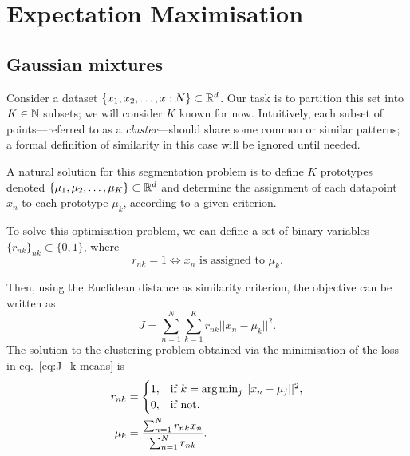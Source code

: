 \chapter{Expectation Maximisation}


\section{Gaussian mixtures}

Consider a dataset $\{x_1,x_2,\ldots,x:N\}\subset{\mathbb R}^d$. Our task is to partition this set into $K\in{\mathbb N}$ subsets; we will consider $K$ known for now.  Intuitively, each subset of points---referred to as a \emph{cluster}---should share some common or similar patterns; a formal definition of similarity in this case will be ignored until needed. 

A natural solution for this segmentation problem is to define $K$ prototypes denoted $\{\mu_1,\mu_2,\ldots,\mu_K\}\subset{\mathbb R}^d$ and determine the assignment of each datapoint $x_n$ to each prototype $\mu_k$, according to a given criterion. 

To solve this optimisation problem, we can define a set of binary variables $\{r_{nk}\}_{nk}\subset\{0,1\}$, where 
\begin{equation}
    r_{nk}=1 \iff x_n\text{ is assigned to } \mu_k. 
\end{equation}

Then, using the Euclidean distance as similarity criterion, the objective can be written as 
\begin{equation}
    J = \sum_{n=1}^{N}\sum_{k=1}^{K} r_{nk} ||x_n-\mu_k||^2.\label{eq:J_k-means}
\end{equation}
The solution to the clustering problem obtained via the minimisation of the loss in eq.~\eqref{eq:J_k-means} is
\begin{align}
r_{nk} &=
\begin{cases}
1, & \text{if } k=\operatorname*{arg\,min}_j||x_n-\mu_j||^2, \\
0, & \text{if not}.
\end{cases} \label{eq:kmeans1}\\
\mu_k &= \frac{\sum_{n=1}^{N}r_{nk}x_n}{\sum_{n=1}^{N}r_{nk}}.\label{eq:kmeans2}
\end{align}

